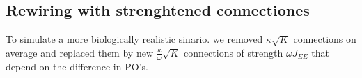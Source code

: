 
\subsection{Rewiring with strenghtened connectiones}
To simulate a more biologically realistic sinario. we removed $\kappa \sqrt{K}$ connections on average and replaced them by new $\frac{\kappa}{\omega} \sqrt{K}$ connections of strength $\omega J_{EE}$ that depend on the difference in PO's.





